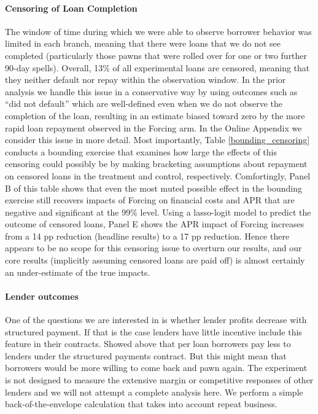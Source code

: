 \documentclass[12pt, a4paper]{article}
\begin{document}
\paragraph*{Censoring of Loan Completion}
The window of time during which we were able to observe borrower behavior was limited in each branch, meaning that there were loans that we do not see completed (particularly those pawns that were rolled over for one or two further 90-day spells).  Overall, 13\% of all experimental loans are censored, meaning that they neither default nor repay within the observation window.  In the prior analysis we handle this issue in a conservative way by using outcomes such as ``did not default'' which are well-defined even when we do not observe the completion of the loan, resulting in an estimate biased toward zero by the more rapid loan repayment observed in the Forcing arm.  In the Online Appendix we consider this issue in more detail.  Most importantly, Table \ref{bounding_censoring} conducts a bounding exercise that examines how large the effects of this censoring could possibly be by making bracketing assumptions about repayment on censored loans in the treatment and control, respectively.  Comfortingly, Panel B of this table shows that even the most muted possible effect in the bounding exercise still recovers impacts of Forcing on financial costs and APR that are negative and significant at the 99\% level.  Using a lasso-logit model to predict the outcome of censored loans, Panel E shows the APR impact of Forcing increases from a 14 pp reduction (headline results) to a 17 pp reduction.  Hence there appears to be no scope for this censoring issue to overturn our results, and our core results (implicitly assuming censored loans are paid off) is almost certainly an under-estimate of the true impacts.

\paragraph{Lender outcomes} One of the questions we are interested in is whether lender profits decrease with structured payment. If that is the case lenders have little incentive include this feature in their contracts. Showed above that per loan borrowers pay less to lenders under the structured payments contract. But this might mean that borrowers would be more willing to come back and pawn again. The experiment is not designed to measure the extensive margin or competitive responses of other lenders and we will not attempt a complete analysis here. We perform a simple back-of-the-envelope calculation that takes into account repeat business.  
\end{document}
